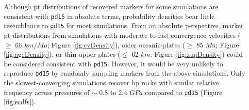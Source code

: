 Although \gls{pt} distributions of recovered markers for some simulations are consistent with \texttt{pd15} in absolute terms, probability densities bear little resemblance to \texttt{pd15} for most simulations. From an absolute perspective, marker \gls{pt} distributions from simulations with moderate to fast convergence velocities (\(\geq\) 66 \(km/Ma\); Figure \ref{fig:cvDensity}), older oceanic-plates (\(\geq\) 85 \(Ma\); Figure \ref{fig:ageDensity}), or thin upper-plates (\(\leq\) 62 \(km\); Figure \ref{fig:zupDensity}) could be considered consistent with \texttt{pd15}. However, it would be very unlikely to reproduce \texttt{pd15} by randomly sampling markers from the above simulations. Only the slowest-converging simulations recover \gls{hp} rocks with similar relative frequency across pressures of \(\sim\) 0.8 to 2.4 \(GPa\) compared to \texttt{pd15} (Figure \ref{fig:ecdfs}).



